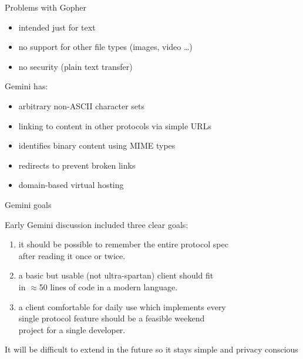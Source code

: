 \documentclass[presentation, 11pt,  aspectratio=169]{beamer}
\begin{document}
\begin{frame}[label={sec:orgb411f85}]{Problems with Gopher}
\begin{itemize}
\item intended just for text\\
\item no support for other file types (images, video \ldots{})\\
\item no security (plain text transfer)\\
\end{itemize}
\pause
\begin{block}{Gemini has:}
\begin{itemize}
\item arbitrary non-ASCII character sets\\
\item linking to content in other protocols via simple URLs\\
\item identifies binary content using MIME types\\
\item redirects to prevent broken links\\
\item domain-based virtual hosting\\
\end{itemize}
\end{block}
\end{frame}

\begin{frame}[label={sec:org9f81b7d}]{Gemini goals}
\begin{block}{Early Gemini discussion included three clear goals:}
\begin{enumerate}
\item it should be possible to remember the entire protocol spec\\
after reading it once or twice.\\

\item a basic but usable (not ultra-spartan) client should fit \\
in \(\approx\)50 lines of code in a modern language.\\

\item a client comfortable for daily use which implements every \\
single protocol feature should be a feasible weekend\\
project for a single developer.\\
\end{enumerate}
\pause
\end{block}
\begin{block}{It will be difficult to extend in the future}
so it \alert{stays} simple and privacy conscious\\
\end{block}
\end{frame}
\end{document}
